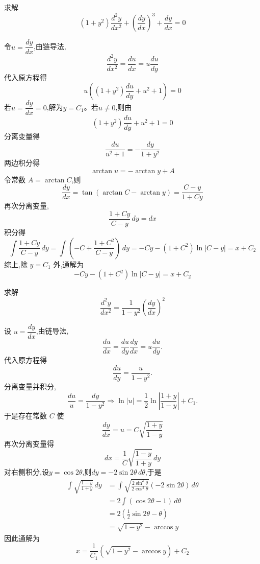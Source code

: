 \begin{questions}
    \question 求解
    \[
    (1+y^2)\frac{d^2y}{dx^2} + \left(\frac{dy}{dx}\right)^3 + \frac{dy}{dx} = 0
    \]
    \begin{solution}
        令$u=\dfrac{dy}{dx}$,由链导法,
        \[
        \frac{d^2y}{dx^2}=\frac{du}{dx}=u\frac{du}{dy}
        \]
        代入原方程得
        \[
        u\left((1+y^2)\frac{du}{dy} + u^2 + 1\right)=0
        \]
        若$u=\dfrac{dy}{dx}=0$,解为$y=C_1$。若$u \neq 0$,则由
        \[
        (1+y^2)\frac{du}{dy} + u^2 + 1 = 0
        \]
        分离变量得
        \[
        \frac{du}{u^2+1} = -\frac{dy}{1+y^2}
        \]
        两边积分得
        \[
        \arctan u = -\arctan y + A 
        \]
        令常数 $A=\arctan C$,则
        \[
        \frac{dy}{dx} = \tan(\arctan C - \arctan y)= \frac{C-y}{1+Cy}
        \]
        再次分离变量,
        \[
        \frac{1+Cy}{C-y}\,dy = dx
        \]
        积分得
        \[
        \int\frac{1+Cy}{C-y}\,dy=\int\left(-C + \frac{1+C^2}{C-y}\right)\,dy = -Cy - (1+C^2)\ln|C-y| = x + C_2
        \]
        综上,除 $y = C_1$ 外,通解为
        \[
        - Cy - (1+C^2)\ln|C-y| = x + C_2
        \]
    \end{solution}

    \question 求解
    \[
    \frac{d^2 y}{dx^2} = \frac{1}{1-y^2}\left(\frac{dy}{dx}\right)^2
    \]
    \begin{solution}
        设 $u=\dfrac{dy}{dx}$,由链导法,
        \[
        \frac{du}{dx}=\frac{du}{dy}\frac{dy}{dx}=u\frac{du}{dy}.
        \]
        代入原方程得
        \[
        \frac{du}{dy}=\frac{u}{1-y^2}.
        \]
        分离变量并积分,
        \[
        \frac{du}{u}=\frac{dy}{1-y^2} \Rightarrow
        \ln|u|=\frac12\ln\!\left|\frac{1+y}{1-y}\right|+C_1.
        \]
        于是存在常数 $C$ 使
        \[
        \frac{dy}{dx}=u=C\sqrt{\frac{1+y}{1-y}}
        \]
        再次分离变量得
        \[
        dx=\frac{1}{C}\sqrt{\frac{1-y}{1+y}}\,dy 
        \]
        对右侧积分,设$y=\cos2\theta$,则$dy=-2\sin 2\theta\,d\theta$,于是
        \begin{align*}
        \int\sqrt{\frac{1-y}{1+y}}\,dy
        &=\int\sqrt{\frac{2\sin^2\theta}{2\cos^2\theta}}(-2\sin 2\theta)\,d\theta\\
        &=2\int(\cos2\theta-1)\,d\theta\\
        &=2\left(\frac{1}{2}\sin 2\theta-\theta\right)\\
        &=\sqrt{1-y^2}-\arccos y 
        \end{align*}
        因此通解为
        \[
        x=\frac{1}{C_1}\left(\sqrt{1-y^2}-\arccos y\right)+C_2
        \]
    \end{solution}


\end{questions}
